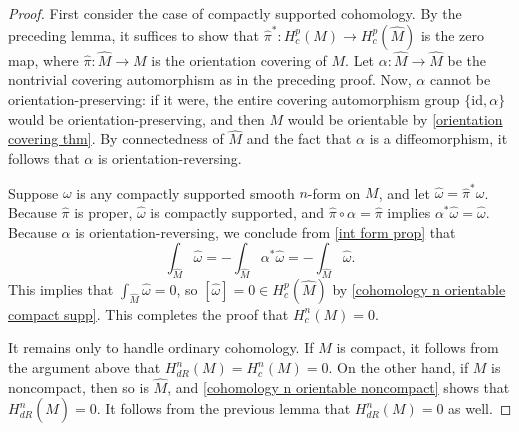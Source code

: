 \begin{proof}
First consider the case of compactly supported cohomology. By the preceding lemma, it suffices to show that $\widehat{\pi}^*:H^p_{c}(M)\to H^p_{c}(\widehat{M})$ is the zero map, where $\widehat{\pi}:\widehat{M}\to M$ is the orientation covering of $M$. Let $\alpha:\widehat{M}\to\widehat{M}$ be the nontrivial covering automorphism as in the preceding proof. Now, $\alpha$ cannot be orientation-preserving: if it were, the entire covering automorphism group $\{\mathrm{id},\alpha\}$ would be orientation-preserving, and then $M$ would be orientable by \cref{orientation covering thm}. By connectedness of $\widehat{M}$ and the fact that $\alpha$ is a diffeomorphism, it follows that $\alpha$ is orientation-reversing.\par
Suppose $\omega$ is any compactly supported smooth $n$-form on $M$, and let $\widehat{\omega}=\widehat{\pi}^*\omega$. Because $\widehat{\pi}$ is proper, $\widehat{\omega}$ is compactly supported, and $\widehat{\pi}\circ\alpha=\widehat{\pi}$ implies $\alpha^*\widehat{\omega}=\widehat{\omega}$. Because $\alpha$ is orientation-reversing, we conclude from \cref{int form prop} that
\[\int_{\widehat{M}}\widehat{\omega}=-\int_{\widehat{M}}\alpha^*\widehat{\omega}=-\int_{\widehat{M}}\widehat{\omega}.\]
This implies that $\int_{\widehat{M}}\widehat{\omega}=0$, so $[\widehat{\omega}]=0\in H^p_c(\widehat{M})$ by \cref{cohomology n orientable compact supp}. This completes the proof that $H^n_c(M)=0$.\par
It remains only to handle ordinary cohomology. If $M$ is compact, it follows from the argument above that $H^n_{dR}(M)=H^n_c(M)=0$. On the other hand, if $M$ is noncompact, then so is $\widehat{M}$, and \cref{cohomology n orientable noncompact} shows that $H^n_{dR}(\widehat{M})=0$. It follows from the previous lemma that $H^n_{dR}(M)=0$ as well.
\end{proof}
